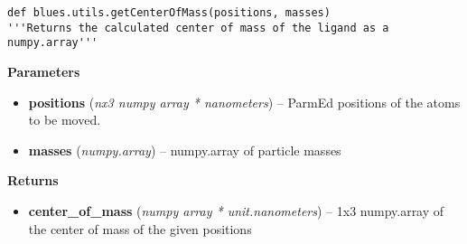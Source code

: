 \begin{description}
\begin{verbatim}
def blues.utils.getCenterOfMass(positions, masses)
'''Returns the calculated center of mass of the ligand as a numpy.array'''
\end{verbatim}

\begin{description}
\item
    \textbf{Parameters}
\begin{itemize}
\item
  \textbf{positions} (\emph{nx3 numpy array * nanometers}) -- ParmEd positions of the atoms to be moved.
\item
  \textbf{masses} (\emph{numpy.array}) -- numpy.array of particle masses
\end{itemize}
\item
    \textbf{Returns}
\begin{itemize}
    \item
    \textbf{center\_of\_mass} (\emph{numpy array * unit.nanometers}) -- 1x3 numpy.array of the center of mass of
    the given positions
\end{itemize}
\end{description}
\end{description}


